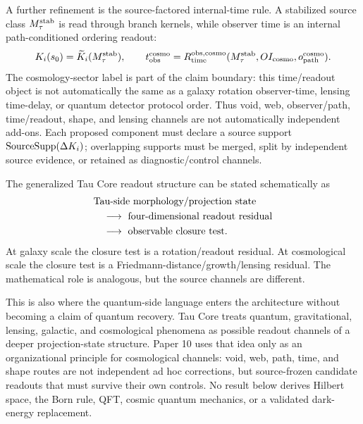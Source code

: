 \documentclass[11pt]{article}
\begin{document}
A further refinement is the source-factored internal-time rule.  A stabilized
source class \(M_\tau^{\rm stab}\) is read through branch kernels, while
observer time is an internal path-conditioned ordering readout:
\[
K_i(s_0)=\widetilde K_i(M_\tau^{\rm stab}),\qquad
t_{\rm obs}^{\rm cosmo}
=R_{\rm time}^{\rm obs,cosmo}
(M_\tau^{\rm stab},OI_{\rm cosmo},o_{\rm path}^{\rm cosmo}).
\]
The cosmology-sector label is part of the claim boundary: this time/readout
object is not automatically the same as a galaxy rotation observer-time,
lensing time-delay, or quantum detector protocol order.
Thus void, web, observer/path, time/readout, shape, and lensing channels are
not automatically independent add-ons.  Each proposed component must declare a
source support \({\rm SourceSupp}(\Delta K_i)\); overlapping supports must be
merged, split by independent source evidence, or retained as
diagnostic/control channels.

The generalized Tau Core readout structure can be stated schematically as
\begin{equation}
\begin{aligned}
&\hbox{Tau-side morphology/projection state}\\
&\quad\longrightarrow\hbox{ four-dimensional readout residual}\\
&\quad\longrightarrow\hbox{ observable closure test}.
\end{aligned}
\end{equation}
At galaxy scale the closure test is a rotation/readout residual. At cosmological
scale the closure test is a Friedmann-distance/growth/lensing residual. The
mathematical role is analogous, but the source channels are different.

This is also where the quantum-side language enters the architecture without
becoming a claim of quantum recovery.  Tau Core treats quantum, gravitational,
lensing, galactic, and cosmological phenomena as possible readout channels of a
deeper projection-state structure.  Paper 10 uses that idea only as an
organizational principle for cosmological channels: void, web, path, time, and
shape routes are not independent ad hoc corrections, but source-frozen
candidate readouts that must survive their own controls.  No result below
derives Hilbert space, the Born rule, QFT, cosmic quantum mechanics, or a
validated dark-energy replacement.
\end{document}
